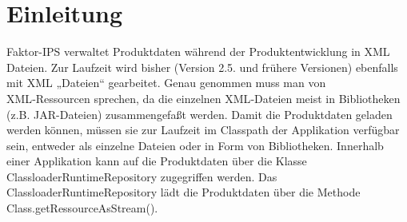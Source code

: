 \section{Einleitung}

Faktor-IPS verwaltet Produktdaten während der Produktentwicklung in XML Dateien. 
Zur Laufzeit wird bisher (Version 2.5. und frühere Versionen) ebenfalls mit XML „Dateien“ gearbeitet.
Genau genommen muss man von XML‑Ressourcen sprechen, da die einzelnen XML‑Dateien meist in Bibliotheken (z.B. JAR-Dateien) zusammengefaßt
werden. Damit die Produktdaten geladen werden können, müssen sie zur Laufzeit im Classpath der Applikation verfügbar sein,
entweder als einzelne Dateien oder in Form von Bibliotheken.
Innerhalb einer Applikation kann auf die Produktdaten über die Klasse ClassloaderRuntimeRepository zugegriffen werden. Das ClassloaderRuntimeRepository lädt die Produktdaten über die Methode Class.getRessourceAsStream().

